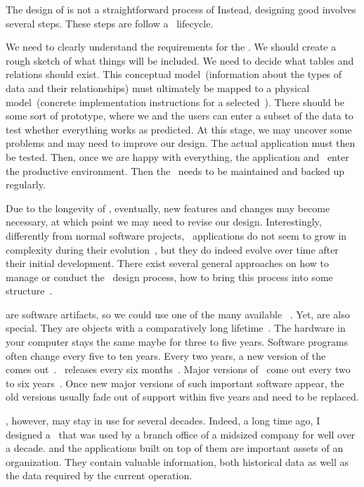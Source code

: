 %
\label{sec:dbLifecycle}%
The design of  is not a straightforward process of 
Instead, designing good  involves several steps.
These steps are follow a \db\ lifecycle.

We need to clearly understand the requirements for the \db.
We should create a rough sketch of what things will be included.
We need to decide what tables and relations should exist.
This conceptual model~(information about the types of data and their relationships) must ultimately be mapped to a physical model~(concrete implementation instructions for a selected~\dbms).
There should be some sort of prototype, where we and the users can enter a subset of the data to test whether everything works as predicted.
At this stage, we may uncover some problems and may need to improve our design.
The actual application must then be tested.
Then, once we are happy with everything, the application and \db\ enter the productive environment.
Then the \db\ needs to be maintained and backed up regularly.

Due to the longevity of , eventually, new features and changes may become necessary, at which point we may need to revise our design.
Interestingly, differently from normal software projects, \db~applications do not seem to grow in complexity during their evolution~\cite{SVZ2014OSD}, but they do indeed evolve over time after their initial development.
There exist several general approaches on how to manage or conduct the \db\ design process, how to bring this process into some structure~\cite{GMTM2011DDLC}.

 are software artifacts, so we could use one of the many available ~\cite{I2018SAH,N2024SEFDS}.
Yet,  are also special.
They are objects with a comparatively long lifetime~\cite{SS2005EIDDDFDB:I}.
The hardware in your computer stays the same maybe for three to five years.
Software programs often change every five to ten years.
Every two years, a new  version of the \ubuntu\  comes out~\cite{C2024TULARC}.
\libreoffice\ releases every six months~\cite{DF2024TDFWR}.
Major versions of \microsoftWindows\ come out every two to six years~\cite{EOEBEB:LOWV}.
Once new major versions of such important software appear, the old versions usually fade out of support within five years and need to be replaced.

, however, may stay in use for several decades.
Indeed, a long time ago, I designed a \db\ that was used by a branch office of a midsized company for well over a decade.
 and the applications built on top of them are important assets of an organization.
They contain valuable information, both historical data as well as the data required by the current operation.

